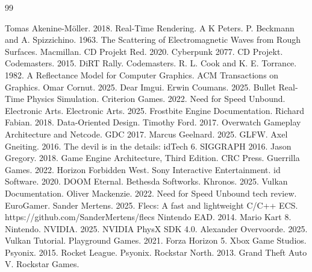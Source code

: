 \documentclass[acmtog, nonacm]{acmart}
\begin{document}
\begin{thebibliography}{99}

 Tomas Akenine-Möller. 2018. Real-Time Rendering. A K Peters.
 P. Beckmann and A. Spizzichino. 1963. The Scattering of Electromagnetic Waves from Rough Surfaces. Macmillan.
 CD Projekt Red. 2020. Cyberpunk 2077. CD Projekt.
 Codemasters. 2015. DiRT Rally. Codemasters.
 R. L. Cook and K. E. Torrance. 1982. A Reflectance Model for Computer Graphics. ACM Transactions on Graphics.
 Omar Cornut. 2025. Dear Imgui.
 Erwin Coumans. 2025. Bullet Real-Time Physics Simulation.
 Criterion Games. 2022. Need for Speed Unbound. Electronic Arts.
 Electronic Arts. 2025. Frostbite Engine Documentation.
 Richard Fabian. 2018. Data-Oriented Design.
 Timothy Ford. 2017. Overwatch Gameplay Architecture and Netcode. GDC 2017.
 Marcus Geelnard. 2025. GLFW.
 Axel Gneiting. 2016. The devil is in the details: idTech 6. SIGGRAPH 2016.
 Jason Gregory. 2018. Game Engine Architecture, Third Edition. CRC Press.
 Guerrilla Games. 2022. Horizon Forbidden West. Sony Interactive Entertainment.
 id Software. 2020. DOOM Eternal. Bethesda Softworks.
 Khronos. 2025. Vulkan Documentation.
 Oliver Mackenzie. 2022. Need for Speed Unbound tech review. EuroGamer.
 Sander Mertens. 2025. Flecs: A fast and lightweight C/C++ ECS. https://github.com/SanderMertens/flecs
 Nintendo EAD. 2014. Mario Kart 8. Nintendo.
 NVIDIA. 2025. NVIDIA PhysX SDK 4.0.
 Alexander Overvoorde. 2025. Vulkan Tutorial.
 Playground Games. 2021. Forza Horizon 5. Xbox Game Studios.
 Psyonix. 2015. Rocket League. Psyonix.
 Rockstar North. 2013. Grand Theft Auto V. Rockstar Games.

\end{thebibliography}
\end{document}
